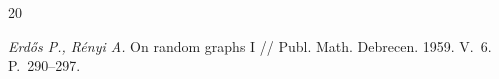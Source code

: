 \newpage

\renewcommand\refname{Литература}
\makeatletter
\renewcommand{\@biblabel}[1]{#1.}
\makeatother

\begin{thebibliography} {20}

{\it Erd\H{o}s P., R\'enyi A.}
On random graphs I
// Publ. Math. Debrecen. 1959. V.~6. P.~290--297.



\end{thebibliography}


